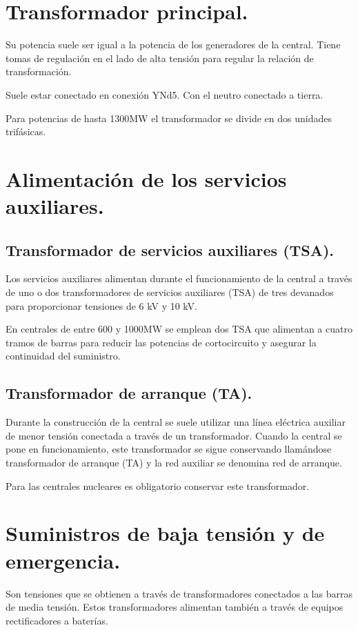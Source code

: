 \section{Transformador principal.}
Su potencia suele ser igual a la potencia de los generadores de la central. Tiene tomas de regulación en el lado de alta tensión para regular la relación de transformación.


Suele estar conectado en conexión YNd5. Con el neutro conectado a tierra.


Para potencias de hasta 1300MW el transformador se divide en dos unidades trifásicas.
\section{Alimentación de los servicios auxiliares.}
\subsection{Transformador de servicios auxiliares (TSA).}
Los servicios auxiliares alimentan durante el funcionamiento de la central a través de uno o dos
transformadores de servicios auxiliares (TSA) de tres devanados para proporcionar tensiones de 6 kV
y 10 kV.

En centrales de entre 600 y 1000MW se emplean dos TSA que alimentan a cuatro tramos de barras para reducir las potencias de cortocircuito y asegurar la continuidad del suministro.
\subsection{Transformador de arranque (TA).}
Durante la construcción de la central se suele utilizar una línea eléctrica auxiliar de menor tensión
conectada a través de un transformador. Cuando la central se pone en funcionamiento, este
transformador se sigue conservando llamándose transformador de arranque (TA) y la red auxiliar se
denomina red de arranque.


Para las centrales nucleares es obligatorio conservar este transformador.
\section{Suministros de baja tensión y de emergencia.}
Son tensiones que se obtienen a través de transformadores conectados a las barras de media tensión. Estos transformadores alimentan también a través de equipos rectificadores a baterías.



